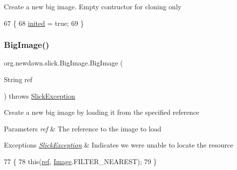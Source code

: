 Create a new big image. Empty contructor for cloning only 
\begin{DoxyCode}
67                        \{
68         \mbox{\hyperlink{classorg_1_1newdawn_1_1slick_1_1_image_aa694324d7d8b46bbe65e066ca29cecfb}{inited}} = \textcolor{keyword}{true};
69     \}
\end{DoxyCode}
\mbox{\label{classorg_1_1newdawn_1_1slick_1_1_big_image_a2c46e1840b346bbd28b3b8f9efcadf39}} 
\subsubsection{\texorpdfstring{Big\+Image()}{BigImage()}\hspace{0.1cm}{\footnotesize\ttfamily [2/6]}}
{\footnotesize\ttfamily org.\+newdawn.\+slick.\+Big\+Image.\+Big\+Image (\begin{DoxyParamCaption}\item[{String}]{ref }\end{DoxyParamCaption}) throws \mbox{\hyperlink{classorg_1_1newdawn_1_1slick_1_1_slick_exception}{Slick\+Exception}}\hspace{0.3cm}{\ttfamily [inline]}}

Create a new big image by loading it from the specified reference


\begin{DoxyParams}{Parameters}
{\em ref} & The reference to the image to load \\
\hline
\end{DoxyParams}

\begin{DoxyExceptions}{Exceptions}
{\em \mbox{\hyperlink{classorg_1_1newdawn_1_1slick_1_1_slick_exception}{Slick\+Exception}}} & Indicates we were unable to locate the resource \\
\hline
\end{DoxyExceptions}

\begin{DoxyCode}
77                                                       \{
78         \textcolor{keyword}{this}(\mbox{\hyperlink{classorg_1_1newdawn_1_1slick_1_1_image_a32694687591a80299d8b8ad1ea070cee}{ref}}, \mbox{\hyperlink{classorg_1_1newdawn_1_1slick_1_1_image_a2c047fa669a8387f6c2d9bde33b3ee04}{Image}}.FILTER\_NEAREST);
79     \}
\end{DoxyCode}
\mbox{\label{classorg_1_1newdawn_1_1slick_1_1_big_image_ad4aeff57f2ebeb47c12511d4f1fcc164}} 
